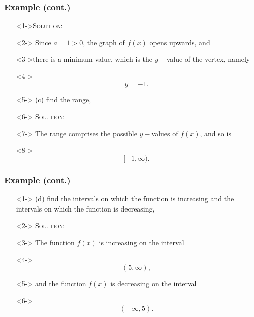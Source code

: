 \documentclass[handout]{beamer}
\begin{document}
\begin{frame}
	\frametitle{Example (cont.)}
	\begin{enumerate}
		\item[]<1->\textsc{Solution:}
		\item[]<2-> Since $a=1>0$, the graph of $f(x)$ opens upwards, and
		\item[]<3->there is a minimum value, which is the $y-$value of the vertex, namely
		\item[]<4-> \[ y=-1.\]
		\item[]<5-> (c) find the range,
		\item[]<6-> \textsc{Solution:}
		\item[]<7-> The range comprises the possible $y-$values of $f(x)$, and so is
		\item[]<8-> \[ [-1, \infty).  \]
	\end{enumerate}
\end{frame}

\begin{frame}
	\frametitle{Example (cont.)}
	\begin{enumerate}
		\item[]<1-> (d) find the intervals on which the function is increasing and the intervals on which the function is decreasing,
		\item[]<2-> \textsc{Solution:}
		\item[]<3-> The function $f(x)$ is increasing on the interval
		\item[]<4-> \[ (5, \infty),\]
		\item[]<5-> and the function $f(x)$ is decreasing on the interval
		\item[]<6-> \[ (-\infty, 5). \]
	\end{enumerate}
\end{frame}
\end{document}
